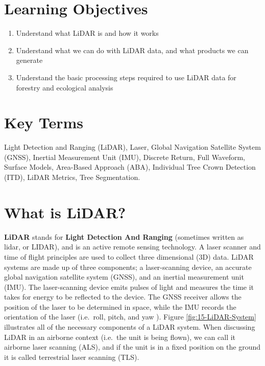 \documentclass[
]{book}
\providecommand{\tightlist}{%
  \setlength{\itemsep}{0pt}\setlength{\parskip}{0pt}}
\begin{document}
\hypertarget{learning-objectives-14}{%
\section*{Learning Objectives}\label{learning-objectives-14}}

\begin{enumerate}
\def\labelenumi{\arabic{enumi}.}
\tightlist
\item
  Understand what LiDAR is and how it works
\item
  Understand what we can do with LiDAR data, and what products we can generate
\item
  Understand the basic processing steps required to use LiDAR data for forestry and ecological analysis
\end{enumerate}

\hypertarget{key-terms-14}{%
\section*{Key Terms}\label{key-terms-14}}

Light Detection and Ranging (LiDAR), Laser, Global Navigation Satellite System (GNSS), Inertial Measurement Unit (IMU), Discrete Return, Full Waveform, Surface Models, Area-Based Approach (ABA), Individual Tree Crown Detection (ITD), LiDAR Metrics, Tree Segmentation.

\hypertarget{what-is-lidar}{%
\section{What is LiDAR?}\label{what-is-lidar}}

\textbf{LiDAR} stands for \textbf{Light Detection And Ranging} (sometimes written as lidar, or LIDAR), and is an active remote sensing technology. A laser scanner and time of flight principles are used to collect three dimensional (3D) data. LiDAR systems are made up of three components; a laser-scanning device, an accurate global navigation satellite system (GNSS), and an inertial measurement unit (IMU). The laser-scanning device emits pulses of light and measures the time it takes for energy to be reflected to the device. The GNSS receiver allows the position of the laser to be determined in space, while the IMU records the orientation of the laser (i.e.~roll, pitch, and yaw \citep{white_best_2013}). Figure \ref{fig:15-LiDAR-System} illustrates all of the necessary components of a LiDAR system. When discussing LiDAR in an airborne context (i.e.~the unit is being flown), we can call it airborne laser scanning (ALS), and if the unit is in a fixed position on the ground it is called terrestrial laser scanning (TLS).
\end{document}
